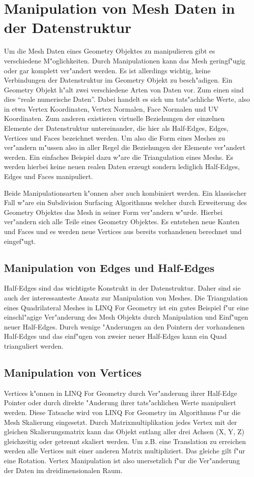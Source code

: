 \documentclass[pagesize, paper=a4, fontsize=12pt,titlepage=true, headings=small, headnosepline, abstractoff, liststotoc, nochapterprefix, plainheadsepline]{scrreprt}
\newcommand{\LFGS}{LINQ For Geometry }
\begin{document}
	\section {Manipulation von Mesh Daten in der Datenstruktur}
		Um die Mesh Daten eines Geometry Objektes zu manipulieren gibt es verschiedene M"oglichkeiten. Durch Manipulationen kann das Mesh geringf"ugig oder gar komplett ver"andert werden. Es ist allerdings wichtig, keine Verbindungen der Datenstruktur im Geometry Objekt zu besch"adigen. Ein Geometry Objekt h"alt zwei verschiedene Arten von Daten vor. Zum einen sind dies "`reale numerische Daten"'. Dabei handelt es sich um tats"achliche Werte, also in etwa Vertex Koordinaten, Vertex Normalen, Face Normalen und UV Koordinaten. Zum anderen existieren virtuelle Beziehungen der einzelnen Elemente der Datenstruktur untereinander, die hier als Half-Edges, Edges, Vertices und Faces bezeichnet werden. Um also die Form eines Meshes zu ver"andern m"ussen also in aller Regel die Beziehungen der Elemente ver"andert werden. Ein einfaches Beispiel dazu w"are die Triangulation eines Meshs. Es werden hierbei keine neuen realen Daten erzeugt sondern lediglich Half-Edges, Edges und Faces manipuliert.
\newline

Beide Manipulationsarten k"onnen aber auch kombiniert werden. Ein klassischer Fall w"are ein Subdivision Surfacing Algorithmus welcher durch Erweiterung des Geometry Objektes das Mesh in seiner Form ver"andern w"urde. Hierbei ver"andern sich alle Teile eines Geometry Objektes. Es entstehen neue Kanten und Faces und es werden neue Vertices aus bereits vorhandenen berechnet und eingef"ugt. 
		\subsection {Manipulation von Edges und Half-Edges}
			Half-Edges sind das wichtigste Konstrukt in der Datenstruktur. Daher sind sie auch der interessanteste Ansatz zur Manipulation von Meshes. Die Triangulation eines Quadrilateral Meshes in \LFGS ist ein gutes Beispiel f"ur eine einschl"agige Ver"anderung des Mesh Objekts durch Manipulation und Einf"ugen neuer Half-Edges. Durch wenige "Anderungen an den Pointern der vorhandenen Half-Edges und das einf"ugen von zweier neuer Half-Edges kann ein Quad trianguliert werden.

		\subsection {Manipulation von Vertices}
			Vertices k"onnen in \LFGS durch Ver"anderung ihrer Half-Edge Pointer oder durch direkte "Anderung ihrer tats"achlichen Werte manipuliert werden. Diese Tatsache wird von \LFGS im Algorithmus f"ur die Mesh Skalierung eingesetzt. Durch Matrixmultiplikation jedes Vertex mit der gleichen Skalierungsmatrix kann das Objekt entlang aller drei Achsen (X, Y, Z) gleichzeitig oder getrennt skaliert werden. Um z.B. eine Translation zu erreichen werden alle Vertices mit einer anderen Matrix multipliziert. Das gleiche gilt f"ur eine Rotation. Vertex Manipulation ist also unersetzlich f"ur die Ver"anderung der Daten im dreidimensionalen Raum.
\end{document}
